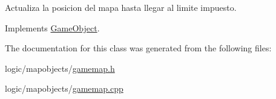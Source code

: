Actualiza la posicion del mapa hasta llegar al limite impuesto. 



Implements \hyperlink{class_game_object_ae83128d0e0efef691417779605ee037c}{Game\-Object}.



The documentation for this class was generated from the following files\-:\begin{DoxyCompactItemize}
\item 
logic/mapobjects/\hyperlink{gamemap_8h}{gamemap.\-h}\item 
logic/mapobjects/\hyperlink{gamemap_8cpp}{gamemap.\-cpp}\end{DoxyCompactItemize}
